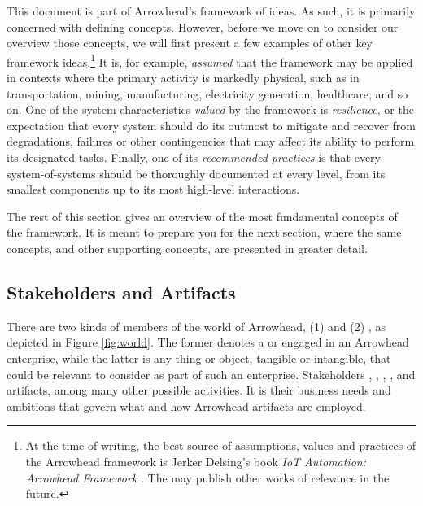 This document is part of Arrowhead's framework of ideas.
As such, it is primarily concerned with defining concepts.
However, before we move on to consider our overview those concepts, we will first present a few examples of other key framework ideas.\footnote{
  At the time of writing, the best source of assumptions, values and practices of the Arrowhead framework is Jerker Delsing's book \textit{{IoT} Automation: Arrowhead Framework} \cite{delsing2017iot}.
  The  may publish other works of relevance in the future.
}
It is, for example, \textit{assumed} that the framework may be applied in contexts where the primary activity is markedly physical, such as in transportation, mining, manufacturing, electricity generation, healthcare, and so on.
One of the system characteristics \textit{valued} by the framework is \textit{resilience}, or the expectation that every system should do its outmost to mitigate and recover from degradations, failures or other contingencies that may affect its ability to perform its designated tasks.
Finally, one of its \textit{recommended practices} is that every system-of-systems should be thoroughly documented at every level, from its smallest components up to its most high-level interactions.

The rest of this section gives an overview of the most fundamental concepts of the framework.
It is meant to prepare you for the next section, where the same concepts, and other supporting concepts, are presented in greater detail.

\subsection{Stakeholders and Artifacts}

There are two kinds of members of the world of Arrowhead, (1)  and (2) , as depicted in Figure \ref{fig:world}.
The former denotes a  or  engaged in an Arrowhead enterprise, while the latter is any thing or object, tangible or intangible, that could be relevant to consider as part of such an enterprise.
Stakeholders , , , , and  artifacts, among many other possible activities.
It is their business needs and ambitions that govern what and how Arrowhead artifacts are employed.

